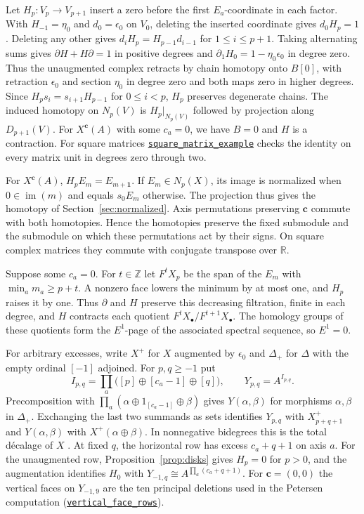 \documentclass[11pt]{article}
\theoremstyle{definition}
\theoremstyle{remark}
\DeclareMathOperator{\im}{im}
\newcommand{\program}[2]{\href{https://github.com/flengyel/SimplicialTensors/blob/c6802c6692215b688864dc18cd9ff3073b804d71/#1}{\nolinkurl{#2}}}
\begin{document}
Let $H_p:V_p\to V_{p+1}$ insert a zero before the first $E_a$-coordinate in each factor.
With $H_{-1}=\eta_0$ and $d_0=\epsilon_0$ on $V_0$, deleting the
inserted coordinate gives $d_0H_p=1$. Deleting any other gives
$d_iH_p=H_{p-1}d_{i-1}$ for $1\leq i\leq p+1$.
Taking alternating sums gives $\partial H+H\partial=1$ in positive degrees
and $\partial_1H_0=1-\eta_0\epsilon_0$ in degree zero. Thus the unaugmented
complex retracts by chain homotopy onto $B[0]$, with retraction $\epsilon_0$
and section $\eta_0$ in degree zero and both maps zero in higher degrees.
Since $H_ps_i=s_{i+1}H_{p-1}$
for $0\leq i<p$, $H_p$ preserves degenerate chains. The induced homotopy on
$N_p(V)$ is $H_p|_{N_p(V)}$ followed by projection along $D_{p+1}(V)$.
For $X^{\mathbf c}(A)$ with some $c_a=0$, we have $B=0$ and $H$ is a
contraction. For square matrices \program{tex/anc/dstm_examples.py\#L164}{square_matrix_example}
checks the identity on every matrix unit in degrees zero through two.

For $X^{\mathbf c}(A)$, $H_pE_m=E_{m+\mathbf1}$. If $E_m\in N_p(X)$,
its image is normalized when $0\in\im(m)$ and equals $s_0E_m$
otherwise. The projection thus gives the homotopy of
Section~\ref{sec:normalized}. Axis permutations preserving $\mathbf c$
commute with both homotopies. Hence the homotopies preserve the fixed
submodule and the submodule on which these permutations act by their signs.
On square complex matrices they commute with conjugate transpose over $\mathbb R$.

Suppose some $c_a=0$. For $t\in\mathbb Z$ let $F^tX_p$ be the span
of the $E_m$ with $\min_a m_a\geq p+t$. A nonzero face lowers the
minimum by at most one, and $H_p$ raises it by one. Thus $\partial$
and $H$ preserve this decreasing filtration, finite in each degree,
and $H$ contracts each quotient $F^tX_\bullet/F^{t+1}X_\bullet$.
The homology groups of these quotients form the $E^1$-page of the
associated spectral sequence, so $E^1=0$.

For arbitrary excesses, write $X^+$ for $X$ augmented by $\epsilon_0$ and
$\Delta_+$ for $\Delta$ with the empty ordinal $[-1]$ adjoined. For $p,q\geq-1$ put
\[
 I_{p,q}=\prod_a\bigl([p]\oplus[c_a-1]\oplus[q]\bigr),\qquad
 Y_{p,q}=A^{I_{p,q}}.
\]
Precomposition with $\prod_a(\alpha\oplus1_{[c_a-1]}\oplus\beta)$ gives
$Y(\alpha,\beta)$ for morphisms $\alpha,\beta$ in $\Delta_+$. Exchanging
the last two summands as sets identifies $Y_{p,q}$ with $X^+_{p+q+1}$ and
$Y(\alpha,\beta)$ with $X^+(\alpha\oplus\beta)$. In nonnegative bidegrees this is the
total d\'ecalage of $X$ \cite[Lemma~3.1]{StevensonDecalage}.
At fixed $q$, the horizontal row has excess $c_a+q+1$ on axis $a$.
For the unaugmented row, Proposition~\ref{prop:disks} gives $H_p=0$ for
$p>0$, and the augmentation identifies $H_0$ with
$Y_{-1,q}\cong A^{\prod_a(c_a+q+1)}$.
For $\mathbf c=(0,0)$ the vertical faces on $Y_{-1,9}$ are the ten
principal deletions used in the Petersen computation
(\program{experiments/petersen_brd_right_cosets.py\#L105}{vertical_face_rows}).
\end{document}
